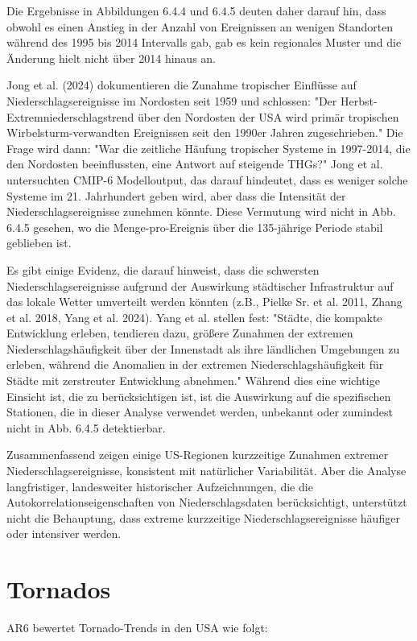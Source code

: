 \documentclass[12pt,paper=a4,DIV=12,parskip=never,chapterprefix=false,headings=standardclasses]{scrreprt}
\begin{document}
Die Ergebnisse in Abbildungen 6.4.4 und 6.4.5 deuten daher darauf hin, dass obwohl es einen Anstieg in der Anzahl von Ereignissen an wenigen Standorten während des 1995 bis 2014 Intervalls gab, gab es kein regionales Muster und die Änderung hielt nicht über 2014 hinaus an.

Jong et al. (2024) dokumentieren die Zunahme tropischer Einflüsse auf Niederschlagsereignisse im Nordosten seit 1959 und schlossen: "Der Herbst-Extremniederschlagstrend über den Nordosten der USA wird primär tropischen Wirbelsturm-verwandten Ereignissen seit den 1990er Jahren zugeschrieben." Die Frage wird dann: "War die zeitliche Häufung tropischer Systeme in 1997-2014, die den Nordosten beeinflussten, eine Antwort auf steigende THGs?" Jong et al. untersuchten CMIP-6 Modelloutput, das darauf hindeutet, dass es weniger solche Systeme im 21. Jahrhundert geben wird, aber dass die Intensität der Niederschlagsereignisse zunehmen könnte. Diese Vermutung wird nicht in Abb. 6.4.5 gesehen, wo die Menge-pro-Ereignis über die 135-jährige Periode stabil geblieben ist.

Es gibt einige Evidenz, die darauf hinweist, dass die schwersten Niederschlagsereignisse aufgrund der Auswirkung städtischer Infrastruktur auf das lokale Wetter umverteilt werden könnten (z.B., Pielke Sr. et al. 2011, Zhang et al. 2018, Yang et al. 2024). Yang et al. stellen fest: "Städte, die kompakte Entwicklung erleben, tendieren dazu, größere Zunahmen der extremen Niederschlagshäufigkeit über der Innenstadt als ihre ländlichen Umgebungen zu erleben, während die Anomalien in der extremen Niederschlagshäufigkeit für Städte mit zerstreuter Entwicklung abnehmen." Während dies eine wichtige Einsicht ist, die zu berücksichtigen ist, ist die Auswirkung auf die spezifischen Stationen, die in dieser Analyse verwendet werden, unbekannt oder zumindest nicht in Abb. 6.4.5 detektierbar.

Zusammenfassend zeigen einige US-Regionen kurzzeitige Zunahmen extremer Niederschlagsereignisse, konsistent mit natürlicher Variabilität. Aber die Analyse langfristiger, landesweiter historischer Aufzeichnungen, die die Autokorrelationseigenschaften von Niederschlagsdaten berücksichtigt, unterstützt nicht die Behauptung, dass extreme kurzzeitige Niederschlagsereignisse häufiger oder intensiver werden.

\section{Tornados}
AR6 bewertet Tornado-Trends in den USA wie folgt:
\end{document}
